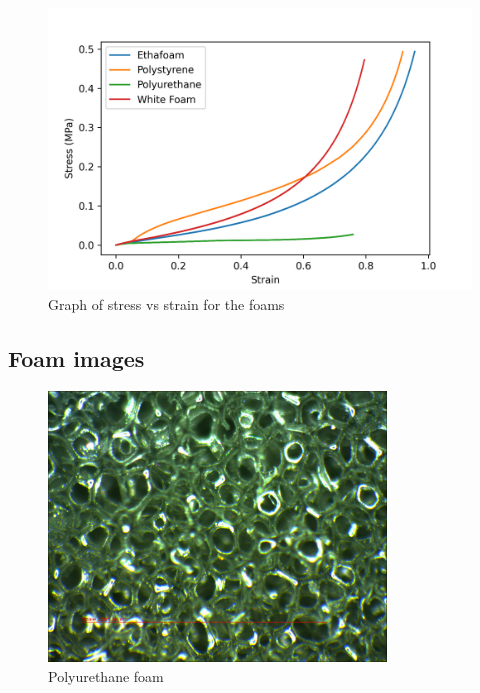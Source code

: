 \documentclass{article}
\begin{document}
\begin{figure}[H]
\centering
\includegraphics[width=1\textwidth]{stress_vs_strain.png}
\caption{\label{fig:stress_vs_strain} Graph of stress vs strain for the foams}
\end{figure}


\subsection{Foam images}

\begin{figure}[H]
\centering
\includegraphics[width=0.8\textwidth]{17_polyurethane.png}
\caption{\label{fig:polyurethane} Polyurethane foam}
\end{figure}
\end{document}
